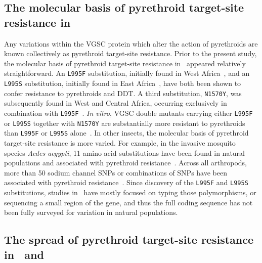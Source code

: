 \begin{refsection}
\subsection{The molecular basis of pyrethroid target-site resistance in \agam}\label{subsec:intro-mol}


Any variations within the VGSC protein which alter the action of pyrethroids are known collectively as pyrethroid target-site resistance.
%
Prior to the present study, the molecular basis of pyrethroid target-site resistance in \agam\ appeared relatively straightforward.
%
An \texttt{L995F} substitution, initially found in West Africa~\parencite{MartinezTorres1998}, and an \texttt{L995S} substitution, initially found in East Africa~\parencite{Ranson2000a}, have both been shown to confer resistance to pyrethroids and DDT\footnotemark.
%
%
A third substitution, \texttt{N1570Y}, was subsequently found in West and Central Africa, occurring exclusively in combination with \texttt{L995F}~\parencite{Jones2012}.
%
\textit{In vitro}, VGSC double mutants carrying either \texttt{L995F} or \texttt{L995S} together with \texttt{N1570Y} are substantially more resistant to pyrethroids than \texttt{L995F} or \texttt{L995S} alone~\parencite{Wang2015}.
%
In other insects, the molecular basis of pyrethroid target-site resistance is more varied.
%
For example, in the invasive mosquito species \textit{Aedes aegypti}, 11 amino acid substitutions have been found in natural populations and associated with pyrethroid resistance~\parencite{Du2016,Haddi2017}.
%
Across all arthropods, more than 50 sodium channel SNPs or combinations of SNPs have been associated with pyrethroid resistance~\parencite{Dong2014}.
%
Since discovery of the \texttt{L995F} and \texttt{L995S} substitutions, studies in \agam\ have mostly focused on typing those polymorphisms, or sequencing a small region of the gene, and thus the full coding sequence has not been fully surveyed for variation in natural populations.


\subsection{The spread of pyrethroid target-site resistance in \agam\ and \acol}\label{subsec:intro-spread}



\end{refsection}
